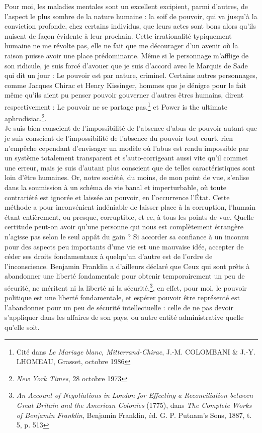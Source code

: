 \documentclass[12pt,a4paper]{article}
\begin{document}
{Pour moi, les maladies mentales sont un excellent \og{}excipient\fg{}, parmi d'autres, de l'aspect le plus sombre de la nature humaine : la soif de pouvoir, qui va jusqu'à la conviction profonde, chez certains individus, que leurs actes sont bons alors qu'ils nuisent de façon évidente à leur prochain. Cette irrationalité typiquement humaine ne me révolte pas, elle ne fait que me décourager d'un avenir où la raison puisse avoir une place prédominante. Même si le personnage m'afflige de son ridicule, je suis forcé d'avouer que je suis d'accord avec le Marquis de Sade qui dit un jour : \og{}Le pouvoir est par nature, criminel\fg{}. Certains autres personnages, comme Jacques Chirac et Henry Kissinger, hommes que je dénigre pour le fait même qu'ils aient pu penser pouvoir gouverner d'autres êtres humains, dirent respectivement : \og{}Le pouvoir ne se partage pas.\footnote{Cité dans \emph{Le Mariage blanc, Mitterrand-Chirac}, J.-M. COLOMBANI \& J.-Y. LHOMEAU, Grasset, octobre 1986}\fg{} et \og{}Power is the ultimate aphrodisiac.\footnote{\emph{New York Times}, 28 octobre 1973}\fg{}.  \\

Je suis bien conscient de l'impossibilité de l'absence d'abus de pouvoir autant que je suis conscient de l'impossibilité de l'absence du pouvoir tout court, rien n'empêche cependant d'envisager un modèle où l'abus est rendu impossible par un système totalement transparent et s'auto-corrigeant aussi vite qu'il commet une erreur, mais je suis d'autant plus conscient que de telles caractéristiques sont loin d'être humaines. Or, notre société, du moins, de mon point de vue, s'enlise dans la soumission à un schéma de vie banal et imperturbable, où toute contrariété est ignorée et laissée au pouvoir, en l'occurrence l'État. Cette méthode a pour inconvénient indéniable de laisser place à la corruption, l'humain étant entièrement, ou presque, corruptible, et ce, à tous les points de vue. Quelle certitude peut-on avoir qu'une personne qui nous est complètement étrangère n'agisse pas selon le seul appât du gain ? Si accorder sa confiance à un inconnu pour des aspects peu importants d'une vie est une mauvaise idée, accepter de céder ses droits fondamentaux à quelqu'un d'autre est de l'ordre de l'inconscience. Benjamin Franklin a d'ailleurs déclaré que \og{}Ceux qui sont prêts à abandonner une liberté fondamentale pour obtenir temporairement un peu de sécurité, ne méritent ni la liberté ni la sécurité.\footnote{\emph{An Account of Negotiations in London for Effecting a Reconciliation between Great Britain and the American Colonies} (1775), dans \emph{The Complete Works of Benjamin Franklin}, Benjamin Franklin, éd. G. P. Putnam’s Sons, 1887, t. 5, p. 513}\fg{}, en effet, pour moi, le pouvoir politique est une liberté fondamentale, et espérer pouvoir être représenté est l'abandonner pour un peu de sécurité intellectuelle : celle de ne pas devoir s'appliquer dans les affaires de son pays, ou autre entité administrative quelle qu'elle soit. \\

}
\end{document}
